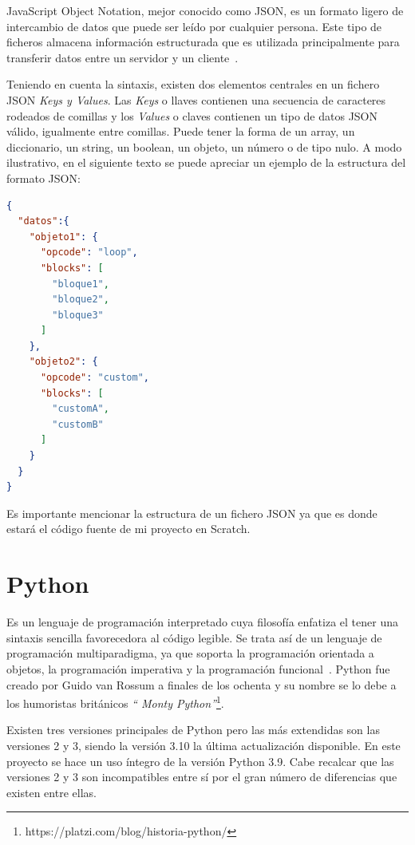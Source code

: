 \documentclass[a4paper, 12pt]{book}
\begin{document}
JavaScript Object Notation, mejor conocido como JSON, es un formato ligero de intercambio de datos que puede ser leído por cualquier persona. Este tipo de ficheros almacena información estructurada que es utilizada principalmente para transferir datos entre un servidor y un cliente~\cite{jsonWeb}.

Teniendo en cuenta la sintaxis, existen dos elementos centrales en un fichero JSON \textit{Keys y Values}. Las \textit{Keys} o llaves contienen una secuencia de caracteres rodeados de comillas y los \textit{Values} o claves contienen un tipo de datos JSON válido, igualmente entre comillas. Puede tener la forma de un array, un diccionario, un string, un boolean, un objeto, un número o de tipo nulo. A modo ilustrativo, en el siguiente texto se puede apreciar un ejemplo de la estructura del formato JSON: %

\begin{lstlisting}[language=json]
{
  "datos":{
    "objeto1": {
      "opcode": "loop",
      "blocks": [
        "bloque1", 
        "bloque2",
        "bloque3"
      ]
    },
    "objeto2": {
      "opcode": "custom",
      "blocks": [
        "customA", 
        "customB"
      ]
    }
  }
}
\end{lstlisting}

Es importante mencionar la estructura de un fichero JSON ya que es donde estará el código fuente de mi proyecto en Scratch.

\section{Python}
\label{sec:Python}

Es un lenguaje de programación interpretado cuya filosofía enfatiza el tener una sintaxis sencilla favorecedora al código legible. Se trata así de un lenguaje de programación multiparadigma, ya que soporta la programación orientada a objetos, la programación imperativa y la programación funcional~\cite{pythonWeb}. Python fue creado por Guido van Rossum a finales de los ochenta y su nombre se lo debe a los humoristas británicos \textit{`` Monty Python''}\footnote{https://platzi.com/blog/historia-python/}.

Existen tres versiones principales de Python pero las más extendidas son las versiones 2 y 3, siendo la versión 3.10 la última actualización disponible. En este proyecto se hace un uso íntegro de la versión Python 3.9. Cabe recalcar que las versiones 2 y 3 son incompatibles entre sí por el gran número de diferencias que existen entre ellas.
\end{document}

